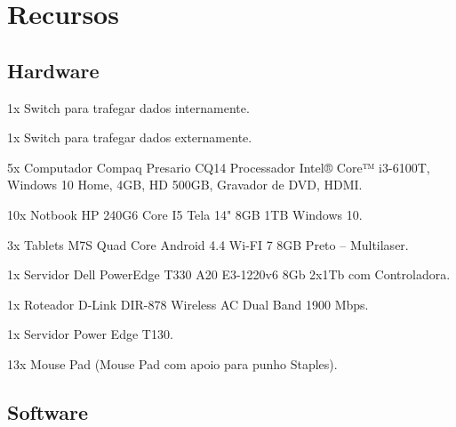 \chapter[Recursos]{Recursos}

\section[Hardware]{Hardware}

\begin{alineas}
    \item 1x Switch para trafegar dados internamente.
    \item 1x Switch para trafegar dados externamente.
    \item 5x Computador Compaq Presario CQ14 Processador Intel® Core™ i3-6100T, Windows 10 Home, 4GB, HD 500GB, Gravador de DVD, HDMI.
    \item 10x Notbook HP 240G6 Core I5 Tela 14" 8GB 1TB Windows 10.
    \item 3x Tablets M7S Quad Core Android 4.4 Wi-FI 7 8GB Preto – Multilaser.
    \item 1x Servidor Dell PowerEdge T330 A20 E3-1220v6 8Gb 2x1Tb com Controladora.
    \item 1x Roteador D-Link DIR-878 Wireless AC Dual Band 1900 Mbps.
    \item 1x Servidor Power Edge T130.
    \item 13x Mouse Pad (Mouse Pad com apoio para punho Staples).
\end{alineas}

\section[Software]{Software}

    

